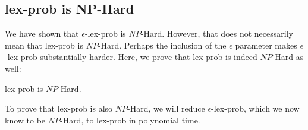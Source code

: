 \documentclass[sigconf]{acmart}
\begin{document}
\subsection{{\sc lex-prob} is NP-Hard}

We have shown that {\sc $\epsilon$-lex-prob} is $NP$-Hard. However, that does not necessarily mean that {\sc lex-prob} is $NP$-Hard. Perhaps the inclusion of the $\epsilon$ parameter makes {\sc $\epsilon$-lex-prob} substantially harder. Here, we prove that {\sc lex-prob} is indeed $NP$-Hard as well: 

\begin{theorem}
\label{elexicasetheorem}
{\sc lex-prob} is $NP$-Hard.
\end{theorem}

To prove that {\sc lex-prob} is also $NP$-Hard, we will reduce {\sc $\epsilon$-lex-prob}, which we now know to be $NP$-Hard, to {\sc lex-prob} in polynomial time.
\end{document}
